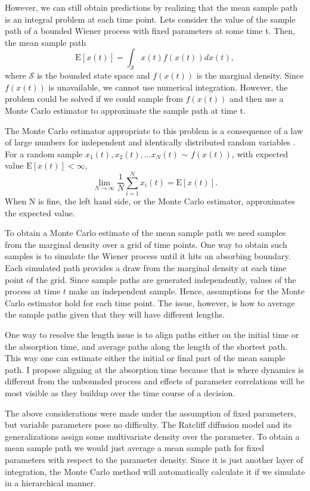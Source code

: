 \documentclass[12pt]{report}
\begin{document}
However, we can still obtain predictions by realizing that the mean sample path is an integral problem at each time point. Lets consider the value of the sample path of a bounded Wiener process with fixed parameters at some time t. Then, the mean sample path
\begin{equation}
\mathrm{E}[x(t)] = \int_{\mathcal{S}}x(t)f(x(t))dx(t),
\end{equation}
where $\mathcal{S}$ is the bounded state space and $f(x(t))$ is the marginal density. Since $f(x(t))$ is unavailable, we cannot use numerical integration. However, the problem could be solved if we could sample from $f(x(t))$ and then use a Monte Carlo estimator to approximate the sample path at time t. 

The Monte Carlo estimator appropriate to this problem is a consequence of a law of large numbers for independent and identically distributed random variables \citep{CasBer2002}. For a random sample $x_1(t), x_2(t), \ldots x_N(t)$ $\sim$ $f(x(t))$, with expected value $\mathrm{E}[x(t)] < \infty$,  
\begin{equation}
\lim_{N \to \infty}\frac{1}{N}\sum_{i=1}^N x_i(t) = \mathrm{E}[x(t)].
\end{equation}
When N is fine, the left hand side, or the Monte Carlo estimator, approximates the expected value.

To obtain a Monte Carlo estimate of the mean sample path we need samples from the marginal density over a grid of time points. One way to obtain such samples is to simulate the Wiener process until it hits an absorbing boundary. Each simulated path provides a draw from the marginal density at each time point of the grid. Since sample paths are generated independently, values of the process at time $t$ make an independent sample. Hence, assumptions for the Monte Carlo estimator hold for each time point. The issue, however, is how to average the sample paths given that they will have different lengths. 

One way to resolve the length issue is to align paths either on the initial time or the absorption time, and average paths along the length of the shortest path. This way one can estimate either the initial or final part of the mean sample path. I propose aligning at the absorption time because that is where dynamics is different from the unbounded process and effects of parameter correlations will be most visible as they buildup over the time course of a decision.

The above considerations were made under the assumption of fixed parameters, but variable parameters pose no difficulty. The Ratcliff diffusion model and its generalizations assign some multivariate density over the parameter. To obtain a mean sample path we would just average a mean sample path for fixed parameters with respect to the parameter density. Since it is just another layer of integration, the Monte Carlo method will automatically calculate it if we simulate in a hierarchical manner.
\end{document}
